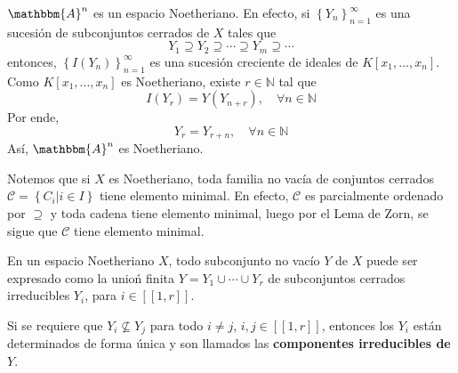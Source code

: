 \documentclass[12pt]{report}
\theoremstyle{largebreak}
\newcommand\natint[1]{\ensuremath{\left[\!\left[ #1\right]\!\right]}}
\newcommand{\bbm}[1]{\ensuremath{\mathbbm{#1}}}
\begin{document}
    \begin{exa}
        $\bbm{A}^n$ es un espacio Noetheriano. En efecto, si $\left\{Y_n \right\}_{ n=1}^\infty$ es una sucesión de subconjuntos cerrados de $X$ tales que
        \begin{equation*}
            Y_1\supseteq Y_2\supseteq\cdots\supseteq Y_m\supseteq\cdots
        \end{equation*}
        entonces, $\left\{I(Y_n) \right\}_{ n=1}^\infty$ es una sucesión creciente de ideales de $K[x_1,...,x_n]$. Como $K[x_1,...,x_n]$  es Noetheriano, existe $r\in\mathbb{N}$ tal que 
        \begin{equation*}
            I(Y_r)=Y(Y_{ n+r}),\quad\forall n\in\mathbb{N}
        \end{equation*}
        Por ende,
        \begin{equation*}
            Y_r=Y_{ r+n},\quad\forall n\in\mathbb{N}
        \end{equation*}
        Así, $\bbm{A}^n$ es Noetheriano.
    \end{exa}

    \begin{obs}
        Notemos que si $X$ es Noetheriano, toda familia no vacía de conjuntos cerrados $\mathcal{C}=\left\{C_i\Big|i\in I \right\}$ tiene elemento minimal. En efecto, $\mathcal{C}$ es parcialmente ordenado por $\supseteq$ y toda cadena tiene elemento minimal, luego por el Lema de Zorn, se sigue que $\mathcal{C}$ tiene elemento minimal.
    \end{obs}

    \begin{propo}
        En un espacio Noetheriano $X$, todo subconjunto no vacío $Y$ de $X$ puede ser expresado como la unioń finita $Y=Y_1\cup\cdots\cup Y_r$ de subconjuntos cerrados irreducibles $Y_i$, para $i\in\natint{1,r}$.

        Si se requiere que $Y_i\nsubseteq Y_j$ para todo $i\neq j$, $i,j\in\natint{1,r}$, entonces los $Y_i$ están determinados de forma única y son llamados las \textbf{componentes irreducibles de $Y$}.
    \end{propo}
\end{document}
